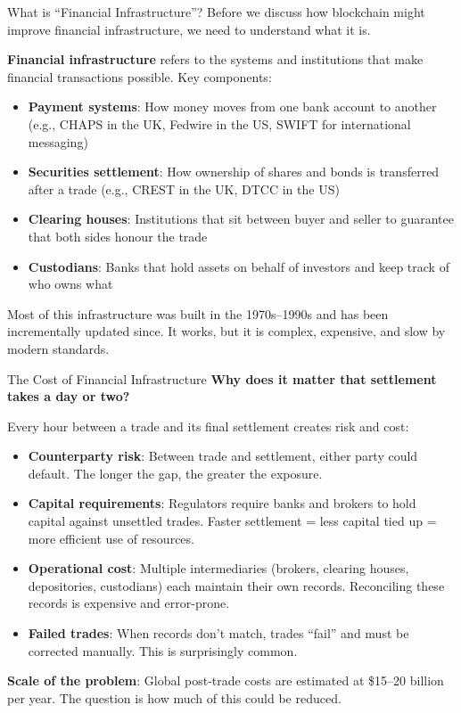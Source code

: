 \documentclass[10pt]{beamer}
\newcommand{\highlight}[1]{\textcolor{AccentOrange}{\textbf{#1}}}
\begin{document}
\begin{frame}{What is ``Financial Infrastructure''?}
  Before we discuss how blockchain might improve financial infrastructure, we need to understand what it is.
  
  \vspace{1em}
  \highlight{Financial infrastructure} refers to the systems and institutions that make financial transactions possible. Key components:
  \begin{itemize}
    \item \textbf{Payment systems}: How money moves from one bank account to another (e.g., CHAPS in the UK, Fedwire in the US, SWIFT for international messaging)
    \item \textbf{Securities settlement}: How ownership of shares and bonds is transferred after a trade (e.g., CREST in the UK, DTCC in the US)
    \item \textbf{Clearing houses}: Institutions that sit between buyer and seller to guarantee that both sides honour the trade
    \item \textbf{Custodians}: Banks that hold assets on behalf of investors and keep track of who owns what
  \end{itemize}
  
  \vspace{1em}
  Most of this infrastructure was built in the 1970s--1990s and has been incrementally updated since. It works, but it is complex, expensive, and slow by modern standards.
\end{frame}

\begin{frame}{The Cost of Financial Infrastructure}
  \textbf{Why does it matter that settlement takes a day or two?}
  
  \vspace{1em}
  Every hour between a trade and its final settlement creates risk and cost:
  \begin{itemize}
    \item \textbf{Counterparty risk}: Between trade and settlement, either party could default. The longer the gap, the greater the exposure.
    \item \textbf{Capital requirements}: Regulators require banks and brokers to hold capital against unsettled trades. Faster settlement = less capital tied up = more efficient use of resources.
    \item \textbf{Operational cost}: Multiple intermediaries (brokers, clearing houses, depositories, custodians) each maintain their own records. Reconciling these records is expensive and error-prone.
    \item \textbf{Failed trades}: When records don't match, trades ``fail'' and must be corrected manually. This is surprisingly common.
  \end{itemize}
  
  \vspace{0.5em}
  \textbf{Scale of the problem}: Global post-trade costs are estimated at \$15--20 billion per year. The question is how much of this could be reduced.
\end{frame}
\end{document}
